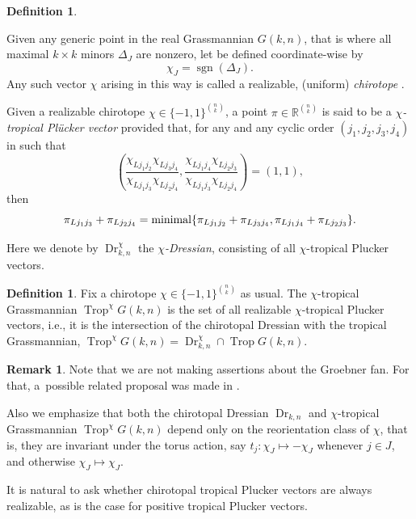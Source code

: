 \documentclass[pdftex]{sigma}
\theoremstyle{definition}
\newtheorem{defn}[thm]{Definition}
\newtheorem{rem}[thm]{Remark}
\def \min {{\rm minimal}}
\numberwithin{equation}{section}
\begin{document}
\begin{defn}\label{defn: chirotopal trop Grass}

Given any generic point in the real Grassmannian $G(k,n)$, that is where all maximal $k\times k$ minors $\Delta_J$ are nonzero, let  be defined coordinate-wise by{\samepage
\[\chi_J = \operatorname{sgn}(\Delta_J).\]
Any such vector $\chi$ arising in this way is called a realizable, (uniform) \emph{chirotope} \cite{bjorner1999oriented}.}

Given a realizable chirotope $\chi \in \{-1,1\}^{\binom{n}{k}}$, a point $\pi \in \mathbb{R}^{\binom{n}{k}}$ is said to be a \emph{$\chi$-tropical Pl\"{u}cker vector} provided that, for any  and any cyclic order $(j_1,j_2,j_3,j_4)$ in  such that
\[
\left(\frac{\chi_{Lj_1j_2}\chi_{Lj_3j_4}}{\chi_{Lj_1j_3}\chi_{Lj_2j_4}},\frac{\chi_{Lj_1j_4}\chi_{Lj_2j_3}}{\chi_{Lj_1j_3}\chi_{Lj_2j_4}} \right) = (1,1),
\]
	then
\[\pi_{Lj_1j_3} + \pi_{Lj_2j_4} = \min \{\pi_{Lj_1j_2} + \pi_{Lj_3j_4}, \pi_{Lj_1j_4} + \pi_{Lj_2j_3}\}.\]

Here we denote by $\operatorname{Dr}^\chi_{k,n}$ the \emph{$\chi$-Dressian}, consisting of all $\chi$-tropical Plucker vectors.
\end{defn}
\begin{defn}
 Fix a chirotope $\chi \in \{-1,1\}^{\binom{n}{k}}$ as usual. The $\chi$-tropical Grassmannian $\operatorname{Trop}^\chi G(k,n)$ is the set of all realizable $\chi$-tropical Plucker vectors, i.e., it is the intersection of the chirotopal Dressian with the tropical Grassmannian, $\operatorname{Trop}^\chi G(k,n) = \operatorname{Dr}^\chi_{k,n} \cap \operatorname{Trop} G(k,n)$.
\end{defn}
\begin{rem}
 Note that we are not making assertions about the Groebner fan. For that, a~possible related proposal was made in \cite[Conjecture 7.1]{bendle2020parallel}.

 Also we emphasize that both the chirotopal Dressian $\operatorname{Dr}_{k,n}$ and $\chi$-tropical Grassmannian $\operatorname{Trop}^\chi G(k,n)$ depend only on the reorientation class of $\chi$, that is, they are invariant under the torus action, say $t_j\colon \chi_J \mapsto -\chi_J$ whenever $j\in J$, and otherwise $\chi_J \mapsto \chi_J$.
\end{rem}
It is natural to ask whether chirotopal tropical Plucker vectors are always realizable, as is the case for positive tropical Plucker vectors.
\end{document}

